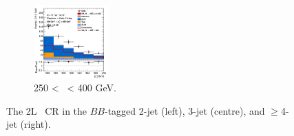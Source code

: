 \begin{figure}[h!]
\begin{subfigure}[b]{\textwidth}
        \includegraphics[width=0.32\textwidth]{Images/VH/Own_fit/prefit_VHbb/Region_distpTV_BMax400_BMin250_DCRHigh_J4_TTypebb_incJet1_T2_L2_Y6051_Prefit.png}
        \caption{250 < \ptv\ < 400 GeV.}
        \label{fig:plots_VHbb_2L_250_CRH}
    \end{subfigure}
    \caption{The 2L \highdr\ CR in the $BB$-tagged 2-jet (left), 3-jet (centre), and $\geq$4-jet (right).}
    \label{fig:plots_VHbb_2L_CRH}
\end{figure} 
\vspace*{\fill}
